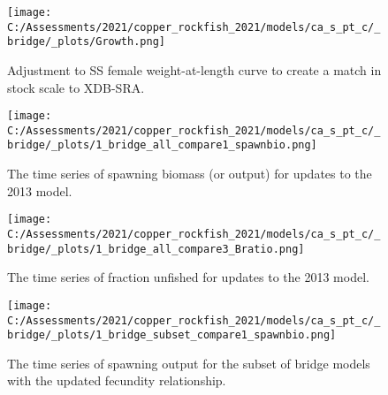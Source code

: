 \documentclass[11pt,
  english,
  a4paper,
]{article}
\begin{document}
\tagmcend\tagstructend


\begin{figure}
\centering
\texttt{[image: C:/Assessments/2021/copper\_rockfish\_2021/models/ca\_s\_pt\_c/\_bridge/\_plots/Growth.png]}
\caption{Adjustment to SS female weight-at-length curve to create a match in stock scale to XDB-SRA.\label{fig:bridge-growth}}
\end{figure}

\tagmcend\tagstructend


\begin{figure}
\centering
\texttt{[image: C:/Assessments/2021/copper\_rockfish\_2021/models/ca\_s\_pt\_c/\_bridge/\_plots/1\_bridge\_all\_compare1\_spawnbio.png]}
\caption{The time series of spawning biomass (or output) for updates to the 2013 model.\label{fig:bridge-ssb}}
\end{figure}

\tagmcend\tagstructend


\begin{figure}
\centering
\texttt{[image: C:/Assessments/2021/copper\_rockfish\_2021/models/ca\_s\_pt\_c/\_bridge/\_plots/1\_bridge\_all\_compare3\_Bratio.png]}
\caption{The time series of fraction unfished for updates to the 2013 model.\label{fig:bridge-depl}}
\end{figure}

\tagmcend\tagstructend


\begin{figure}
\centering
\texttt{[image: C:/Assessments/2021/copper\_rockfish\_2021/models/ca\_s\_pt\_c/\_bridge/\_plots/1\_bridge\_subset\_compare1\_spawnbio.png]}
\caption{The time series of spawning output for the subset of bridge models with the updated fecundity relationship.\label{fig:bridge-ssb-2}}
\end{figure}
\end{document}
